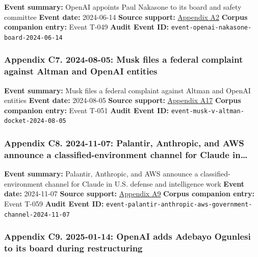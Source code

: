 \documentclass[
  american,
  11pt,
  letterpaper,
]{article}
\begin{document}
\textbf{Event summary:} OpenAI appoints Paul Nakasone to its board and
safety committee \textbf{Event date:} 2024-06-14 \textbf{Source
support:}
\hyperref[ch-08-appendix-a2-openai-appoints-former-top-us-cyberwarrior-paul-nakasone-to-its-board-of-directors]{Appendix
A2} \textbf{Corpus companion entry:} Event T-049 \textbf{Audit Event
ID:} \texttt{event-openai-nakasone-board-2024-06-14}

\subsubsection{Appendix C7. 2024-08-05: Musk files a federal complaint
against Altman and OpenAI
entities}\label{ch-08-appendix-c7-2024-08-05-musk-files-a-federal-complaint-against-altman-and-openai-entities}

\textbf{Event summary:} Musk files a federal complaint against Altman
and OpenAI entities \textbf{Event date:} 2024-08-05 \textbf{Source
support:}
\hyperref[ch-08-appendix-a17-musk-v-altman-4-24-cv-04722]{Appendix A17}
\textbf{Corpus companion entry:} Event T-051 \textbf{Audit Event ID:}
\texttt{event-musk-v-altman-docket-2024-08-05}

\subsubsection{Appendix C8. 2024-11-07: Palantir, Anthropic, and AWS
announce a classified-environment channel for Claude
in\ldots{}}\label{ch-08-appendix-c8-2024-11-07-palantir-anthropic-and-aws-announce-a-classified-environment-channel-for-claude-in-u-s-defense-and-intelligence-work}

\textbf{Event summary:} Palantir, Anthropic, and AWS announce a
classified-environment channel for Claude in U.S. defense and
intelligence work \textbf{Event date:} 2024-11-07 \textbf{Source
support:}
\hyperref[ch-08-appendix-a9-anthropic-and-palantir-partner-to-bring-claude-ai-models-to-aws-for-u-s-government-intelligence-and-defense-operations]{Appendix
A9} \textbf{Corpus companion entry:} Event T-059 \textbf{Audit Event
ID:} \texttt{event-palantir-anthropic-aws-government-channel-2024-11-07}

\subsubsection{Appendix C9. 2025-01-14: OpenAI adds Adebayo Ogunlesi to
its board during
restructuring}\label{ch-08-appendix-c9-2025-01-14-openai-adds-adebayo-ogunlesi-to-its-board-during-restructuring}
\end{document}
